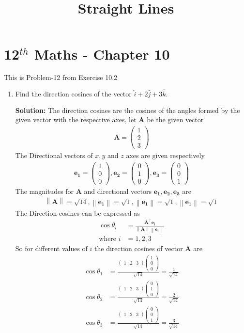\documentclass[12pt]{article}
\providecommand{\norm}[1]{\left\lVert#1\right\rVert}
\newcommand{\solution}{\noindent \textbf{Solution: }}
\newcommand{\myvec}[1]{\ensuremath{\begin{pmatrix}#1\end{pmatrix}}}
\let\vec\mathbf
\begin{document}
\begin{center}
\enlargethispage{-4cm}
\title{\textbf{Straight Lines}}
\date{\vspace{-5ex}} %
\maketitle
\end{center}
\setcounter{page}{1}
\section*{12$^{th}$ Maths - Chapter 10}
This is Problem-12 from Exercise 10.2
\begin{enumerate}
\item Find the direction cosines of the vector $\hat{i} +2\hat{j}+3\hat{k}$.

\solution The direction cosines are the cosines of the angles formed by the given vector with the respective axes, let $\vec{A}$ be the given vector
\begin{align}
	\vec{A} =\myvec{1\\2\\3}
\end{align}
The Directional vectors of $x,y$ and $z$ axes are given respectively 
\begin{align}
		\vec{e_1} =\myvec{1\\0\\0},\vec{e_2}=\myvec{0\\1\\0},\vec{e_3} =\myvec{0\\0\\1}
\end{align}
		The magnitudes for $\vec{A}$ and directional vectors $\vec{e_1},\vec{e_2},\vec{e_3}$ are
	\begin{align}
\norm{\vec{A}} =\sqrt{14},\norm{\vec{e_1}}=\sqrt{1},\norm{\vec{e_1}}=\sqrt{1},\norm{\vec{e_1}}=\sqrt{1}
	\end{align}
The Direction cosines can be expressed as 
\begin{align}
	\cos\theta_i&=\frac{\vec{A}^\top\vec{e_i}}{\norm{\vec{A}}\norm{\vec{e_i}}}\\
	\text{where }i&=1,2,3  
\end{align}
		So for different values of $i$ the direction cosines of vector $\vec{A}$ are
\begin{align}
	\cos\theta_1 &=\frac{\myvec{1&2&3}\myvec{1\\0\\0}}{\sqrt{14}}=\frac{1}{\sqrt{14}}\\
	\cos\theta_2 &=\frac{\myvec{1&2&3}\myvec{0\\1\\0}}{\sqrt{14}}=\frac{2}{\sqrt{14}}\\
	\cos\theta_3 &=\frac{\myvec{1&2&3}\myvec{0\\0\\1}}{\sqrt{14}}=\frac{3}{\sqrt{14}}
\end{align}
\end{enumerate}
\end{document}
